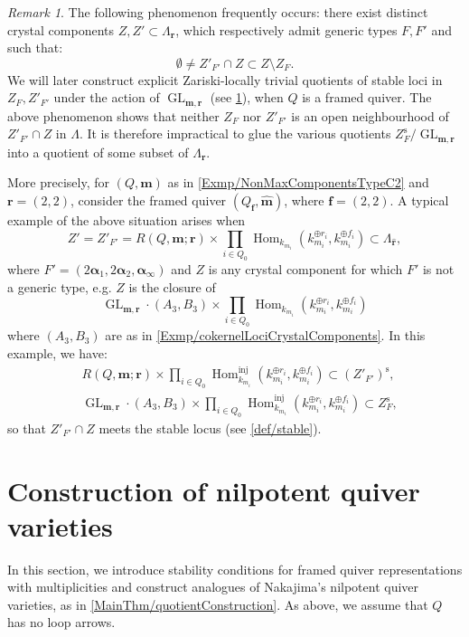 \documentclass[a4paper,12pt]{article}
\theoremstyle{definition}
\theoremstyle{plain}
\theoremstyle{remark}
\newtheorem{remark}[definition]{Remark}
\DeclareMathOperator{\GL}{GL}
\DeclareMathOperator{\Hom}{Hom}
\newcommand{\st}{\mathrm{s}}
\newcommand\bfalpha{\bm{\alpha}}
\newcommand\bff{\mathbf{f}}
\newcommand\bfm{\mathbf{m}}
\newcommand\bfr{\mathbf{r}}
\begin{document}
\begin{remark}
The following phenomenon frequently occurs: there exist distinct crystal components $Z,Z'\subset\Lambda_\bfr$, which respectively admit generic types $F,F'$ and such that: 
\[
\emptyset\ne Z'_{F'}\cap Z\subset Z\setminus Z_F
.
\]
We will later construct explicit Zariski-locally trivial quotients of stable loci in $Z_F,Z'_{F'}$ under the action of $\GL_{\bfm,\bfr}$ (see \cref{Sect/constructionNilpQuiverVar}), when $Q$ is a framed quiver. The above phenomenon shows that neither $Z_F$ nor $Z'_{F'}$ is an open neighbourhood of $Z'_{F'}\cap Z$ in $\Lambda$. It is therefore impractical to glue the various quotients $Z_F^\st/\GL_{\bfm,\bfr}$ into a quotient of some subset of $\Lambda_\bfr$.

More precisely, for $(Q,\bfm)$ as in \cref{Exmp/NonMaxComponentsTypeC2} and $\bfr=(2,2)$, consider the framed quiver $(Q_\bff,\widehat{\bfm})$, where $\bff=(2,2)$. A typical example of the above situation arises when
\[
Z'=Z'_{F'}=R(Q,\bfm;\bfr)\times\prod_{i\in Q_0}\Hom_{k_{m_i}}(k_{m_i}^{\oplus r_i},k_{m_i}^{\oplus f_i})
\subset\Lambda_{\widehat{\bfr}}
,
\]
where $F'=(2\bfalpha_1,2\bfalpha_2,\bfalpha_\infty)$ and $Z$ is any crystal component for which $F'$ is not a generic type, e.g. $Z$ is the closure of
\[
\GL_{\bfm,\bfr}\cdot (A_3,B_3)\times\prod_{i\in Q_0}\Hom_{k_{m_i}}(k_{m_i}^{\oplus r_i},k_{m_i}^{\oplus f_i})
\]
where $(A_3,B_3)$ are as in \cref{Exmp/cokernelLociCrystalComponents}. In this example, we have:
\begin{align*}
& R(Q,\bfm;\bfr)\times\prod_{i\in Q_0}\Hom_{k_{m_i}}^{\mathrm{inj}}(k_{m_i}^{\oplus r_i},k_{m_i}^{\oplus f_i})\subset(Z'_{F'})^\st
, \\
& \GL_{\bfm,\bfr}\cdot (A_3,B_3)\times\prod_{i\in Q_0}\Hom_{k_{m_i}}^{\mathrm{inj}}(k_{m_i}^{\oplus r_i},k_{m_i}^{\oplus f_i})\subset Z_F^\st
,
\end{align*}
so that $Z'_{F'} \cap Z$ meets the stable locus (see \cref{def/stable}).
\end{remark}

\section{Construction of nilpotent quiver varieties}\label{Sect/constructionNilpQuiverVar}

In this section, we introduce stability conditions for framed quiver representations with multiplicities and construct analogues of Nakajima's nilpotent quiver varieties, as in \cref{MainThm/quotientConstruction}. As above, we assume that $Q$ has no loop arrows.
\end{document}
